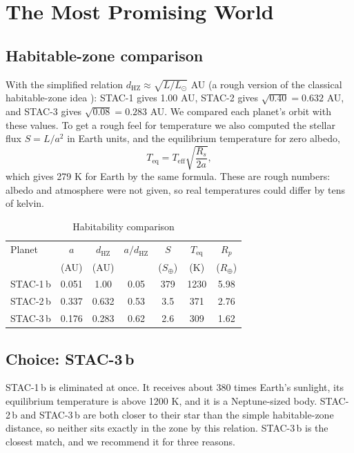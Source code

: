 \documentclass[10pt,twocolumn]{article}
\newcommand{\Rearth}{R_{\oplus}}
\begin{document}
\section{The Most Promising World}

\subsection{Habitable-zone comparison}
With the simplified relation $d_\text{HZ}\approx\sqrt{L/L_\odot}$ AU (a rough version of the classical habitable-zone idea \cite{kasting}): STAC-1 gives 1.00 AU, STAC-2 gives $\sqrt{0.40}=0.632$ AU, and STAC-3 gives $\sqrt{0.08}=0.283$ AU. We compared each planet's orbit with these values. To get a rough feel for temperature we also computed the stellar flux $S=L/a^2$ in Earth units, and the equilibrium temperature for zero albedo,
\begin{equation}
T_\text{eq}=T_\text{eff}\sqrt{\frac{R_s}{2a}},
\end{equation}
which gives 279 K for Earth by the same formula. These are rough numbers: albedo and atmosphere were not given, so real temperatures could differ by tens of kelvin.

\begin{table}[h]
\centering
\caption{Habitability comparison}
\small
\setlength{\tabcolsep}{3.5pt}
\begin{tabular}{lcccccc}
\toprule
Planet & $a$ & $d_\text{HZ}$ & $a/d_\text{HZ}$ & $S$ & $T_\text{eq}$ & $R_p$\\
 & (AU) & (AU) & & ($S_\oplus$) & (K) & ($\Rearth$)\\
\midrule
STAC-1\,b & 0.051 & 1.00 & 0.05 & 379 & 1230 & 5.98\\
STAC-2\,b & 0.337 & 0.632 & 0.53 & 3.5 & 371 & 2.76\\
STAC-3\,b & 0.176 & 0.283 & 0.62 & 2.6 & 309 & 1.62\\
\bottomrule
\end{tabular}
\end{table}

\subsection{Choice: STAC-3\,b}
STAC-1\,b is eliminated at once. It receives about 380 times Earth's sunlight, its equilibrium temperature is above 1200 K, and it is a Neptune-sized body. STAC-2\,b and STAC-3\,b are both closer to their star than the simple habitable-zone distance, so neither sits exactly in the zone by this relation. STAC-3\,b is the closest match, and we recommend it for three reasons.
\end{document}

